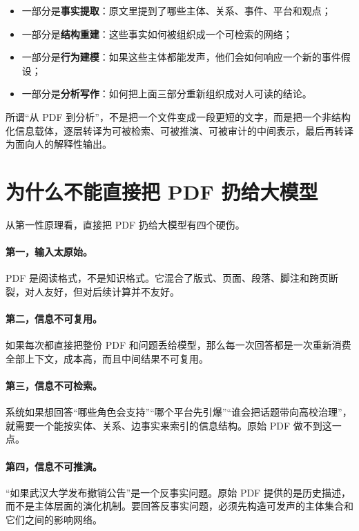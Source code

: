 \documentclass[UTF8,10pt,oneside]{ctexbook}
\begin{document}
\begin{itemize}
  \item 一部分是\textbf{事实提取}：原文里提到了哪些主体、关系、事件、平台和观点；
  \item 一部分是\textbf{结构重建}：这些事实如何被组织成一个可检索的网络；
  \item 一部分是\textbf{行为建模}：如果这些主体都能发声，他们会如何响应一个新的事件假设；
  \item 一部分是\textbf{分析写作}：如何把上面三部分重新组织成对人可读的结论。
\end{itemize}

\begin{definitionbox}
所谓“从 PDF 到分析”，不是把一个文件变成一段更短的文字，而是把一个非结构化信息载体，逐层转译为可被检索、可被推演、可被审计的中间表示，最后再转译为面向人的解释性输出。
\end{definitionbox}

\section{为什么不能直接把 PDF 扔给大模型}

从第一性原理看，直接把 PDF 扔给大模型有四个硬伤。

\paragraph{第一，输入太原始。}
PDF 是阅读格式，不是知识格式。它混合了版式、页面、段落、脚注和跨页断裂，对人友好，但对后续计算并不友好。

\paragraph{第二，信息不可复用。}
如果每次都直接把整份 PDF 和问题丢给模型，那么每一次回答都是一次重新消费全部上下文，成本高，而且中间结果不可复用。

\paragraph{第三，信息不可检索。}
系统如果想回答“哪些角色会支持”“哪个平台先引爆”“谁会把话题带向高校治理”，就需要一个能按实体、关系、边事实来索引的信息结构。原始 PDF 做不到这一点。

\paragraph{第四，信息不可推演。}
“如果武汉大学发布撤销公告”是一个反事实问题。原始 PDF 提供的是历史描述，而不是主体层面的演化机制。要回答反事实问题，必须先构造可发声的主体集合和它们之间的影响网络。
\end{document}
